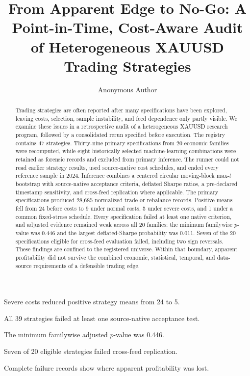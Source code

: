 \documentclass[a4paper,fleqn]{cas-sc}
\begin{document}
\let\WriteBookmarks\relax
\def\floatpagepagefraction{.8}
\def\textpagefraction{.1}

\title[mode=title]{From Apparent Edge to No-Go: A Point-in-Time, Cost-Aware Audit of Heterogeneous XAUUSD Trading Strategies}

\author[1]{Anonymous Author}

\begin{abstract}
Trading strategies are often reported after many specifications have been explored, leaving costs, selection, sample instability, and feed dependence only partly visible. We examine these issues in a retrospective audit of a heterogeneous XAUUSD research program, followed by a consolidated rerun specified before execution. The registry contains 47 strategies. Thirty-nine primary specifications from 20 economic families were recomputed, while eight historically selected machine-learning combinations were retained as forensic records and excluded from primary inference. The runner could not read earlier strategy results, used source-native cost schedules, and ended every reference sample in 2024. Inference combines a centered circular moving-block max-$t$ bootstrap with source-native acceptance criteria, deflated Sharpe ratios, a pre-declared timestamp sensitivity, and cross-feed replication where applicable. The primary specifications produced 28,685 normalized trade or rebalance records. Positive means fell from 24 before costs to 9 under normal costs, 5 under severe costs, and 1 under a common fixed-stress schedule. Every specification failed at least one native criterion, and adjusted evidence remained weak across all 20 families: the minimum familywise $p$-value was 0.446 and the largest deflated-Sharpe probability was 0.011. Seven of the 20 specifications eligible for cross-feed evaluation failed, including two sign reversals. These findings are confined to the registered universe. Within that boundary, apparent profitability did not survive the combined economic, statistical, temporal, and data-source requirements of a defensible trading edge.
\end{abstract}

\begin{highlights}
\item Severe costs reduced positive strategy means from 24 to 5.
\item All 39 strategies failed at least one source-native acceptance test.
\item The minimum familywise adjusted $p$-value was 0.446.
\item Seven of 20 eligible strategies failed cross-feed replication.
\item Complete failure records show where apparent profitability was lost.
\end{highlights}
\end{document}

